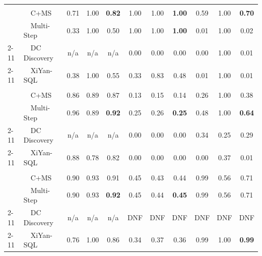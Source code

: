\begin{tabular}{llccccccccc}
\midrule
\addlinespace[2pt]
\multicolumn{11}{c}{\textbf{Tax}} \\
\addlinespace[1pt]
\multirow{2}{*}{\system} & ~~C+MS & 0.71 & 1.00 & \textbf{0.82} & 1.00 & 1.00 & \textbf{1.00} & 0.59 & 1.00 & \textbf{0.70} \\
 & ~~Multi-Step & 0.33 & 1.00 & 0.50 & 1.00 & 1.00 & \textbf{1.00} & 0.01 & 1.00 & 0.02 \\
\cmidrule(l){2-11}
\multirow{1}{*}{Profiling} & ~~DC Discovery & n/a & n/a & n/a & 0.00 & 0.00 & 0.00 & 0.00 & 1.00 & 0.01 \\
\cmidrule(l){2-11}
\multirow{1}{*}{Text2SQL} & ~~XiYan-SQL & 0.38 & 1.00 & 0.55 & 0.33 & 0.83 & 0.48 & 0.01 & 1.00 & 0.01 \\
\midrule
\addlinespace[2pt]
\multicolumn{11}{c}{\textbf{HMDAZ}} \\
\addlinespace[1pt]
\multirow{2}{*}{\system} & ~~C+MS & 0.86 & 0.89 & 0.87 & 0.13 & 0.15 & 0.14 & 0.26 & 1.00 & 0.38 \\
 & ~~Multi-Step & 0.96 & 0.89 & \textbf{0.92} & 0.25 & 0.26 & \textbf{0.25} & 0.48 & 1.00 & \textbf{0.64} \\
\cmidrule(l){2-11}
\multirow{1}{*}{Profiling} & ~~DC Discovery & n/a & n/a & n/a & 0.00 & 0.00 & 0.00 & 0.34 & 0.25 & 0.29 \\
\cmidrule(l){2-11}
\multirow{1}{*}{Text2SQL} & ~~XiYan-SQL & 0.88 & 0.78 & 0.82 & 0.00 & 0.00 & 0.00 & 0.00 & 0.37 & 0.01 \\
\midrule
\addlinespace[2pt]
\multicolumn{11}{c}{\textbf{HMDA Checks}} \\
\addlinespace[1pt]
\multirow{2}{*}{\system} & ~~C+MS & 0.90 & 0.93 & 0.91 & 0.45 & 0.43 & 0.44 & 0.99 & 0.56 & 0.71 \\
 & ~~Multi-Step & 0.90 & 0.93 & \textbf{0.92} & 0.45 & 0.44 & \textbf{0.45} & 0.99 & 0.56 & 0.71 \\
\cmidrule(l){2-11}
\multirow{1}{*}{Profiling} & ~~DC Discovery & n/a & n/a & n/a & DNF & DNF & DNF & DNF & DNF & DNF \\
\cmidrule(l){2-11}
\multirow{1}{*}{Text2SQL} & ~~XiYan-SQL & 0.76 & 1.00 & 0.86 & 0.34 & 0.37 & 0.36 & 0.99 & 1.00 & \textbf{0.99} \\
\bottomrule
\end{tabular}
